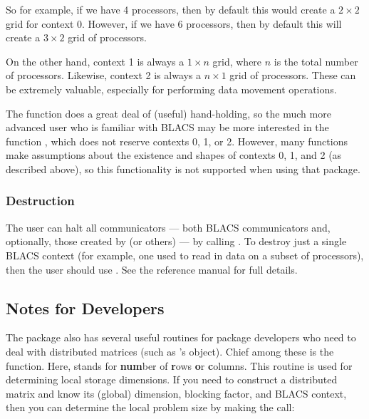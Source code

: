 So for example, if we have 4 processors, then by default this would create a $2\times 2$ grid for context 0.  However, if we have 6 processors, then by default this will create a $3\times 2$ grid of processors.

On the other hand, context 1 is always a $1\times n$ grid, where $n$ is the total number of processors.  Likewise, context 2 is always a $n\times 1$ grid of processors.  These can be extremely valuable, especially for performing data movement operations.

The function  does a great deal of (useful) hand-holding, so the much more advanced user who is familiar with BLACS may be more interested in the function , which does not reserve contexts 0, 1, or 2.  However, many  functions make assumptions about the existence and shapes of contexts 0, 1, and 2 (as described above), so this functionality is not supported when using that package.

\subsubsection{Destruction}

The user can halt all communicators --- both BLACS communicators and, optionally, those created by  (or others) --- by calling .  To destroy just a single BLACS context (for example, one used to read in data on a subset of processors), then the user should use .  See the  reference manual for full details.



\subsection{Notes for Developers}

The  package also has several useful routines for package developers who need to deal with distributed matrices (such as 's  object).  Chief among these is the  function.  Here,  stands for \textbf{num}ber of \textbf{r}ows \textbf{o}r \textbf{c}olumns.  This routine is used for determining local storage dimensions.  If you need to construct a distributed matrix and know its (global) dimension, blocking factor, and BLACS context, then you can determine the local problem size by making the call:

